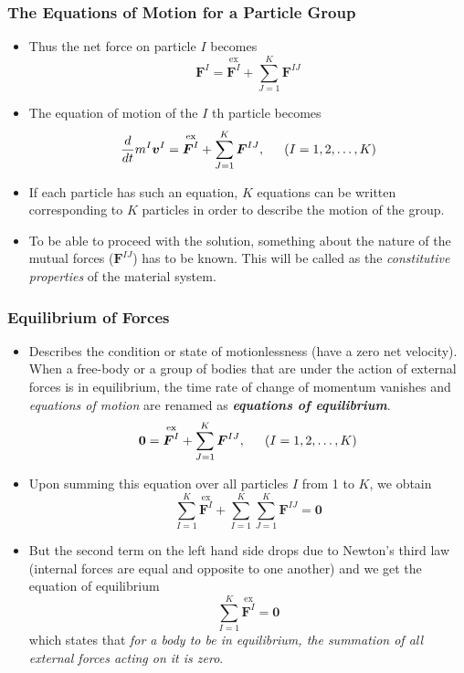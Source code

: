 \documentclass[11pt]{article}
\begin{document}
\subsubsection*{The Equations of Motion for a Particle Group}
\label{sec:org6fedd2f}
\begin{itemize}
\item Thus the net force on particle \(I\) becomes
$$ \boldsymbol{F}^{I} = \overset{\mathrm{ex}}{\boldsymbol{F}^I} + \sum_{J=1}^K \boldsymbol{F}^{IJ} $$
\item The equation of motion of the \(I\) th particle becomes
$$ \frac{d}{dt} m^I\boldsymbol{v}^{I} = \overset{\mathrm{ex}}{\boldsymbol{F}^I} + \sum_{J=1}^K \boldsymbol{F}^{IJ}, \hspace{1.5em} (I = 1,2,\ldots,K) $$
\item If each particle has such an equation, \(K\) equations can be written corresponding to \(K\) particles in order to describe the motion of the group.
\item To be able to proceed with the solution, something about the nature of the mutual forces (\(\boldsymbol{F}^{IJ}\)) has to be known. This will be called as the \emph{constitutive properties} of the material system.
\end{itemize}
\subsubsection*{Equilibrium of Forces}
\label{sec:org1b7ef27}
\begin{itemize}
\item Describes the condition or state of motionlessness (have a zero net velocity). When a free-body or a group of bodies that are under the action of external forces is in equilibrium, the time rate of change of momentum vanishes and \emph{equations of motion} are renamed as \textbf{\emph{equations of equilibrium}}.
$$ \boldsymbol{0} = \overset{\mathrm{ex}}{\boldsymbol{F}^I} + \sum_{J=1}^K \boldsymbol{F}^{IJ}, \hspace{1.5em} (I = 1,2,\ldots,K) $$
\item Upon summing this equation over all particles \(I\) from 1 to \(K\), we obtain
$$ \sum_{I=1}^K \overset{\mathrm{ex}}{\boldsymbol{F}^I} + \sum_{I=1}^K  \sum_{J=1}^K \boldsymbol{F}^{IJ} =  \boldsymbol{0} $$
\item But the second term on the left hand side drops due to Newton's third law (internal forces are equal and opposite to one another) and we get the equation of equilibrium
$$ \sum_{I=1}^K \overset{\mathrm{ex}}{\boldsymbol{F}^I} =  \boldsymbol{0} $$
which states that \emph{for a body to be in equilibrium, the summation of all external forces acting on it is zero}.
\end{itemize}
\end{document}
